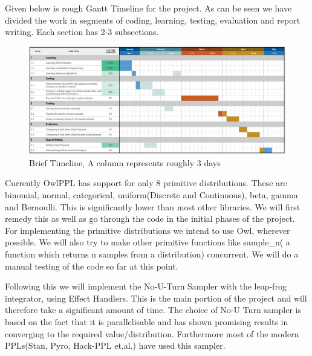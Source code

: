 \documentclass[12pt]{extarticle}
\begin{document}
Given below is rough Gantt Timeline for the project. As can be seen we have divided the work in segments of coding, learning, testing, evaluation and report writing. Each section has 2-3 subsections. 
\begin{figure}[!htb]
    \centering
    \includegraphics[width=\textwidth]{./images/gantt2.jpeg}
    \caption{Brief Timeline, A column represents roughly 3 days}
    \label{fig:my_label}
\end{figure}


Currently OwlPPL has support for only 8 primitive distributions. These are binomial, normal, categorical, uniform(Discrete and Continuous), beta, gamma and Bernoulli. This is significantly lower than most other libraries. We will first remedy this as well as go through the code in the initial phases of the project. For implementing the primitive distributions we intend to use Owl\cite{wang2018owl}, wherever possible. We will also try to make other primitive functions like sample\_n( a function which returns n samples from a distribution) concurrent. We will do a manual testing of the code so far at this point. 

Following this we will implement the No-U-Turn Sampler\cite{hoffman2011nouturn} with the leap-frog integrator,  using Effect Handlers. This is the main portion of the project and will therefore take a significant amount of time.  The choice of No-U Turn sampler is based on the fact that it is parallelisable and has shown promising results in converging to the required value/distribution. Furthermore most of the modern PPLs(Stan, Pyro, Hack-PPL et.al.) have used this sampler.  
\end{document}
